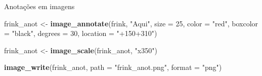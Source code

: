 \documentclass[
  ignorenonframetext,
]{beamer}
\newenvironment{Shaded}{\begin{snugshade}}{\end{snugshade}}
\newcommand{\DataTypeTok}[1]{\textcolor[rgb]{0.13,0.29,0.53}{#1}}
\newcommand{\DecValTok}[1]{\textcolor[rgb]{0.00,0.00,0.81}{#1}}
\newcommand{\KeywordTok}[1]{\textcolor[rgb]{0.13,0.29,0.53}{\textbf{#1}}}
\newcommand{\NormalTok}[1]{#1}
\newcommand{\StringTok}[1]{\textcolor[rgb]{0.31,0.60,0.02}{#1}}
\begin{document}
\begin{frame}[fragile]{Anotações em imagens}
\protect\hypertarget{anotauxe7uxf5es-em-imagens}{}

\begin{Shaded}
\begin{Highlighting}[]
\NormalTok{frink_anot <-}\StringTok{ }\KeywordTok{image_annotate}\NormalTok{(frink, }\StringTok{"Aqui"}\NormalTok{, }\DataTypeTok{size =} \DecValTok{25}\NormalTok{,}
                             \DataTypeTok{color =} \StringTok{"red"}\NormalTok{,}
                             \DataTypeTok{boxcolor =} \StringTok{"black"}\NormalTok{,}
                             \DataTypeTok{degrees =} \DecValTok{30}\NormalTok{, }
                             \DataTypeTok{location =} \StringTok{"+150+310"}\NormalTok{)}

\NormalTok{frink_anot <-}\StringTok{ }\KeywordTok{image_scale}\NormalTok{(frink_anot, }\StringTok{"x350"}\NormalTok{)}

\KeywordTok{image_write}\NormalTok{(frink_anot, }\DataTypeTok{path =} \StringTok{"frink_anot.png"}\NormalTok{, }\DataTypeTok{format =} \StringTok{"png"}\NormalTok{)}
\end{Highlighting}
\end{Shaded}

\end{frame}
\end{document}
